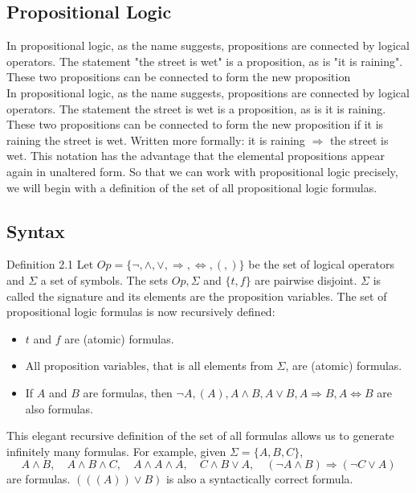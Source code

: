 \documentclass[10pt]{book}
\begin{document}
\subsection{Propositional Logic}
In propositional logic, as the name suggests, propositions are connected by logical operators. The statement "the street is wet" is a proposition, as is "it is raining". These two propositions can be connected to form the new proposition\\
In propositional logic, as the name suggests, propositions are connected by logical operators. The statement the street is wet is a proposition, as is it is raining. These two propositions can be connected to form the new proposition if it is raining the street is wet. Written more formally: it is raining $\Rightarrow$ the street is wet. This notation has the advantage that the elemental propositions appear again in unaltered form. So that we can work with propositional logic precisely, we will begin with a definition of the set of all propositional logic formulas.

\subsection{Syntax}
Definition 2.1 Let $Op=\{\neg, \wedge, \vee, \Rightarrow, \Leftrightarrow, (, )\}$ be the set of logical operators and $\Sigma$ a set of symbols. The sets $Op, \Sigma$ and $\{t, f\}$ are pairwise disjoint. $\Sigma$ is called the signature and its elements are the proposition variables. The set of propositional logic formulas is now recursively defined:
\begin{itemize}
  \item $t$ and $f$ are (atomic) formulas.
  \item All proposition variables, that is all elements from $\Sigma$, are (atomic) formulas.
  \item If $A$ and $B$ are formulas, then $\neg A,(A), A \wedge B, A \vee B, A \Rightarrow B, A \Leftrightarrow B$ are also formulas.
\end{itemize}

This elegant recursive definition of the set of all formulas allows us to generate infinitely many formulas. For example, given $\Sigma=\{A, B, C\}$,
\[
A \wedge B, \quad A \wedge B \wedge C, \quad A \wedge A \wedge A, \quad C \wedge B \vee A, \quad(\neg A \wedge B) \Rightarrow(\neg C \vee A)
\]
are formulas. $(((A)) \vee B)$ is also a syntactically correct formula.
\end{document}
